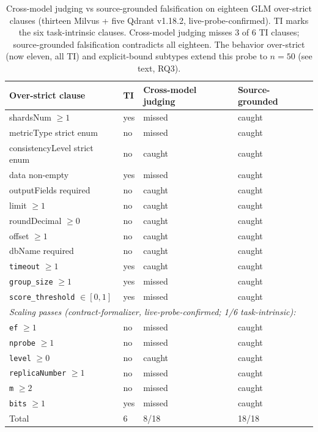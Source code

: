 \documentclass[sigconf]{acmart}
\begin{document}
\begin{table}[t]
\caption{Cross-model judging vs source-grounded falsification on eighteen GLM over-strict clauses (thirteen Milvus + five Qdrant v1.18.2, live-probe-confirmed). TI marks the six task-intrinsic clauses. Cross-model judging misses 3 of 6 TI clauses; source-grounded falsification contradicts all eighteen. The behavior over-strict (now eleven, all TI) and explicit-bound subtypes extend this probe to $n{=}50$ (see text, RQ3).}
\label{tab:e2}
\small
\begin{tabular}{@{}lp{}p{}p{}@{}}
\toprule
Over-strict clause & TI & Cross-model judging & Source-grounded \\
\midrule
shardsNum $\geq 1$ & yes & missed & caught \\
metricType strict enum & no & missed & caught \\
consistencyLevel strict enum & no & caught & caught \\
data non-empty & yes & missed & caught \\
outputFields required & no & caught & caught \\
limit $\geq 1$ & no & caught & caught \\
roundDecimal $\geq 0$ & no & caught & caught \\
offset $\geq 1$ & no & caught & caught \\
dbName required & no & caught & caught \\
\midrule
\texttt{timeout} $\geq 1$ & yes & caught & caught \\
\texttt{group\_size} $\geq 1$ & yes & missed & caught \\
\texttt{score\_threshold} $\in[0,1]$ & yes & missed & caught \\
\midrule
\multicolumn{4}{l}{\emph{Scaling passes (contract-formalizer, live-probe-confirmed; 1/6 task-intrinsic):}} \\
\texttt{ef} $\geq 1$ & no & missed & caught \\
\texttt{nprobe} $\geq 1$ & no & missed & caught \\
\texttt{level} $\geq 0$ & no & caught & caught \\
\texttt{replicaNumber} $\geq 1$ & no & missed & caught \\
\texttt{m} $\geq 2$ & no & missed & caught \\
\texttt{bits} $\geq 1$ & yes & missed & caught \\
\midrule
Total & 6 & 8/18 & 18/18 \\
\bottomrule
\end{tabular}
\end{table}
\end{document}
